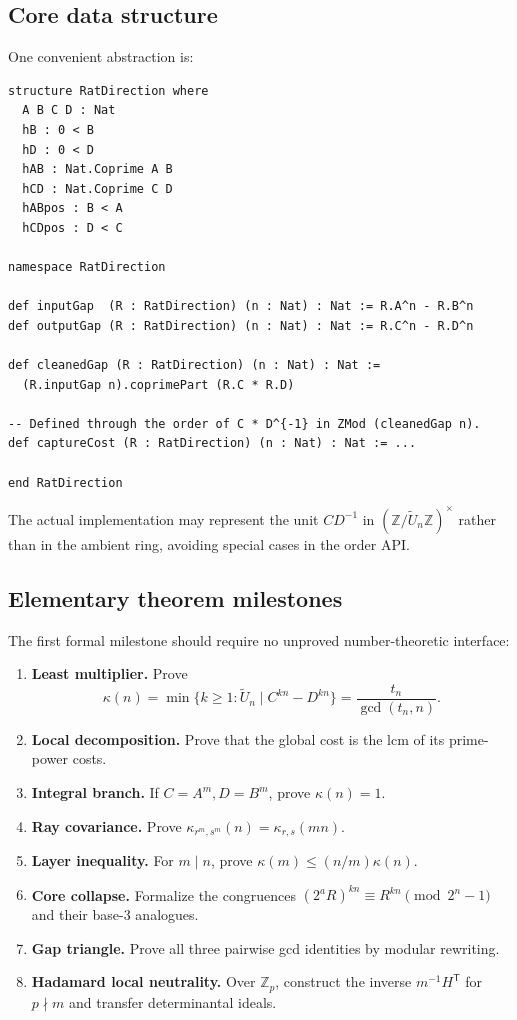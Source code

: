 \documentclass[11pt,oneside]{article}
\theoremstyle{definition}
\theoremstyle{remark}
\begin{document}
\subsection{Core data structure}

One convenient abstraction is:
\begin{lstlisting}[style=pythonstyle,language={},caption={Lean-style pseudocode for a reduced direction.}]
structure RatDirection where
  A B C D : Nat
  hB : 0 < B
  hD : 0 < D
  hAB : Nat.Coprime A B
  hCD : Nat.Coprime C D
  hABpos : B < A
  hCDpos : D < C

namespace RatDirection

def inputGap  (R : RatDirection) (n : Nat) : Nat := R.A^n - R.B^n
def outputGap (R : RatDirection) (n : Nat) : Nat := R.C^n - R.D^n

def cleanedGap (R : RatDirection) (n : Nat) : Nat :=
  (R.inputGap n).coprimePart (R.C * R.D)

-- Defined through the order of C * D^{-1} in ZMod (cleanedGap n).
def captureCost (R : RatDirection) (n : Nat) : Nat := ...

end RatDirection
\end{lstlisting}
The actual implementation may represent the unit $CD^{-1}$ in
$(\mathbb Z/\widetilde U_n\mathbb Z)^\times$ rather than in the ambient ring, avoiding
special cases in the order API.

\subsection{Elementary theorem milestones}

The first formal milestone should require no unproved number-theoretic interface:

\begin{enumerate}[label=\textbf{L\arabic*.}]
\item \textbf{Least multiplier.}  Prove
\[
 \kappa(n)=\min\{k\ge1:\widetilde U_n\mid C^{kn}-D^{kn}\}
 =\frac{t_n}{\gcd(t_n,n)}.
\]
\item \textbf{Local decomposition.}  Prove that the global cost is the lcm of its prime-power
costs.
\item \textbf{Integral branch.}  If $C=A^m,D=B^m$, prove $\kappa(n)=1$.
\item \textbf{Ray covariance.}  Prove
$\kappa_{r^m,s^m}(n)=\kappa_{r,s}(mn)$.
\item \textbf{Layer inequality.}  For $m\mid n$, prove
$\kappa(m)\le(n/m)\kappa(n)$.
\item \textbf{Core collapse.}  Formalize the congruences
$(2^aR)^{kn}\equiv R^{kn}\pmod{2^n-1}$ and their base-$3$ analogues.
\item \textbf{Gap triangle.}  Prove all three pairwise gcd identities by modular rewriting.
\item \textbf{Hadamard local neutrality.}  Over $\mathbb Z_p$, construct the inverse
$m^{-1}H^{\mathsf T}$ for $p\nmid m$ and transfer determinantal ideals.
\end{enumerate}
\end{document}
